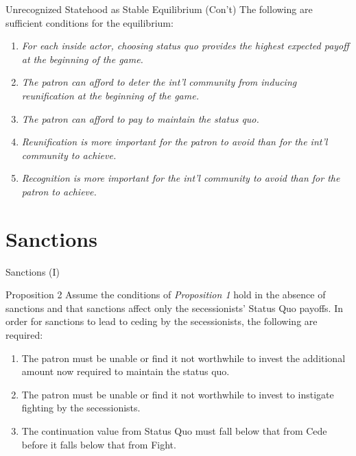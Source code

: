 \documentclass[handout]{beamer}
\begin{document}
\begin{frame}{Unrecognized Statehood as Stable Equilibrium (Con't)}
\pause
  The following are sufficient conditions for the equilibrium:
	\begin{enumerate}[<+->]
		\item \textit{For each inside actor, choosing status quo provides the highest expected payoff at the beginning of the game.}

\item  \textit{The patron can afford to deter the int'l community from inducing reunification at the beginning of the game.}

\item \textit{The patron can afford to pay to maintain the status quo.}

\item \textit{Reunification is more important for the patron to avoid than for the int'l community to achieve.}

\item  \textit{Recognition is more important for the int'l community to avoid than for the patron to achieve.}

	\end{enumerate}
\end{frame}

\section{Sanctions}
\begin{frame}{Sanctions (I)}
\begin{beamerboxesrounded}[upper=palette tertiary, shadow=true]{Proposition 2}
  Assume the conditions of \emph{Proposition 1} hold in the absence of sanctions and that sanctions affect only the secessionists' Status Quo payoffs. In order for sanctions to lead to ceding by the secessionists, the following are required:
	\pause
	\begin{enumerate}[<+->]
\item The patron must be unable or find it not worthwhile to invest the additional amount now required to maintain the status quo.

\item The patron must be unable or find it not worthwhile to invest to instigate fighting by the secessionists.

\item The continuation value from Status Quo must fall below that from Cede before it falls below that from Fight.
\end{enumerate}

\end{beamerboxesrounded}

\end{frame}
\end{document}
